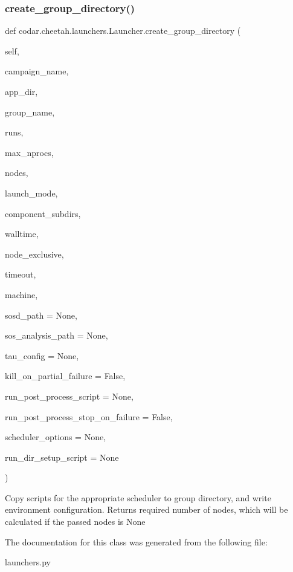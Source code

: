 \subsubsection{\texorpdfstring{create\+\_\+group\+\_\+directory()}{create\_group\_directory()}}
{\footnotesize\ttfamily def codar.\+cheetah.\+launchers.\+Launcher.\+create\+\_\+group\+\_\+directory (\begin{DoxyParamCaption}\item[{}]{self,  }\item[{}]{campaign\+\_\+name,  }\item[{}]{app\+\_\+dir,  }\item[{}]{group\+\_\+name,  }\item[{}]{runs,  }\item[{}]{max\+\_\+nprocs,  }\item[{}]{nodes,  }\item[{}]{launch\+\_\+mode,  }\item[{}]{component\+\_\+subdirs,  }\item[{}]{walltime,  }\item[{}]{node\+\_\+exclusive,  }\item[{}]{timeout,  }\item[{}]{machine,  }\item[{}]{sosd\+\_\+path = {\ttfamily None},  }\item[{}]{sos\+\_\+analysis\+\_\+path = {\ttfamily None},  }\item[{}]{tau\+\_\+config = {\ttfamily None},  }\item[{}]{kill\+\_\+on\+\_\+partial\+\_\+failure = {\ttfamily False},  }\item[{}]{run\+\_\+post\+\_\+process\+\_\+script = {\ttfamily None},  }\item[{}]{run\+\_\+post\+\_\+process\+\_\+stop\+\_\+on\+\_\+failure = {\ttfamily False},  }\item[{}]{scheduler\+\_\+options = {\ttfamily None},  }\item[{}]{run\+\_\+dir\+\_\+setup\+\_\+script = {\ttfamily None} }\end{DoxyParamCaption})}

\begin{DoxyVerb}Copy scripts for the appropriate scheduler to group directory,
and write environment configuration. Returns required number of nodes,
which will be calculated if the passed nodes is None\end{DoxyVerb}
 

The documentation for this class was generated from the following file\+:\begin{DoxyCompactItemize}
\item 
launchers.\+py\end{DoxyCompactItemize}
